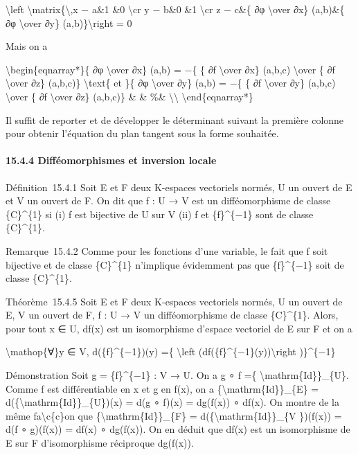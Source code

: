 \documentclass[]{article}
\begin{document}
\textbackslash{}left
\textbar{}\textbackslash{}matrix\{\textbackslash{},x − a\&1 \&0
\textbackslash{}cr y − b\&0 \&1 \textbackslash{}cr z − c\&\{ ∂φ
\textbackslash{}over ∂x\} (a,b)\&\{ ∂φ \textbackslash{}over ∂y\}
(a,b)\}\textbackslash{}right \textbar{} = 0

Mais on a

\textbackslash{}begin\{eqnarray*\}\{ ∂φ \textbackslash{}over ∂x\} (a,b)
= −\{ \{ ∂f \textbackslash{}over ∂x\} (a,b,c) \textbackslash{}over \{ ∂f
\textbackslash{}over ∂z\} (a,b,c)\} \textbackslash{}text\{ et \}\{ ∂φ
\textbackslash{}over ∂y\} (a,b) = −\{ \{ ∂f \textbackslash{}over ∂y\}
(a,b,c) \textbackslash{}over \{ ∂f \textbackslash{}over ∂z\} (a,b,c)\}
\& \& \%\& \textbackslash{}\textbackslash{}
\textbackslash{}end\{eqnarray*\}

Il suffit de reporter et de développer le déterminant suivant la
première colonne pour obtenir l'équation du plan tangent sous la forme
souhaitée.

\paragraph{15.4.4 Difféomorphismes et inversion locale}

Définition~15.4.1 Soit E et F deux K-espaces vectoriels normés, U un
ouvert de E et V un ouvert de F. On dit que f : U → V est un
difféomorphisme de classe \{C\}\^{}\{1\} si (i) f est bijective de U sur
V (ii) f et \{f\}\^{}\{−1\} sont de classe \{C\}\^{}\{1\}.

Remarque~15.4.2 Comme pour les fonctions d'une variable, le fait que f
soit bijective et de classe \{C\}\^{}\{1\} n'implique évidemment pas que
\{f\}\^{}\{−1\} soit de classe \{C\}\^{}\{1\}.

Théorème~15.4.5 Soit E et F deux K-espaces vectoriels normés, U un
ouvert de E, V un ouvert de F, f : U → V un difféomorphisme de classe
\{C\}\^{}\{1\}. Alors, pour tout x ∈ U, df(x) est un isomorphisme
d'espace vectoriel de E sur F et on a

\textbackslash{}mathop\{∀\}y ∈ V, d(\{f\}\^{}\{−1\})(y) =\{
\textbackslash{}left (df(\{f\}\^{}\{−1\}(y))\textbackslash{}right
)\}\^{}\{−1\}

Démonstration Soit g = \{f\}\^{}\{−1\} : V → U. On a g ∘ f =\{
\textbackslash{}mathrm\{Id\}\}\_\{U\}. Comme f est différentiable en x
et g en f(x), on a \{\textbackslash{}mathrm\{Id\}\}\_\{E\} =
d(\{\textbackslash{}mathrm\{Id\}\}\_\{U\})(x) = d(g ∘ f)(x) = dg(f(x)) ∘
df(x). On montre de la même fa\textbackslash{}c\{c\}on que
\{\textbackslash{}mathrm\{Id\}\}\_\{F\} =
d(\{\textbackslash{}mathrm\{Id\}\}\_\{V \})(f(x)) = d(f ∘ g)(f(x)) =
df(x) ∘ dg(f(x)). On en déduit que df(x) est un isomorphisme de E sur F
d'isomorphisme réciproque dg(f(x)).
\end{document}
